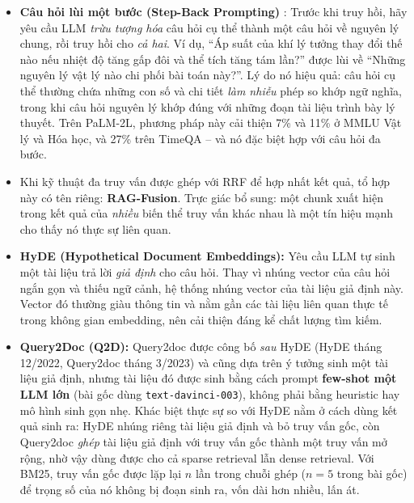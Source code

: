 \begin{itemize}
	\item \textbf{Câu hỏi lùi một bước (Step-Back Prompting)} \cite{zheng2024stepback}: Trước khi truy hồi, hãy yêu cầu LLM \emph{trừu tượng hóa} câu hỏi cụ thể thành một câu hỏi về nguyên lý chung, rồi truy hồi cho \emph{cả hai}. Ví dụ, “Áp suất của khí lý tưởng thay đổi thế nào nếu nhiệt độ tăng gấp đôi và thể tích tăng tám lần?” được lùi về “Những nguyên lý vật lý nào chi phối bài toán này?”. Lý do nó hiệu quả: câu hỏi cụ thể thường chứa những con số và chi tiết \emph{làm nhiễu} phép so khớp ngữ nghĩa, trong khi câu hỏi nguyên lý khớp đúng với những đoạn tài liệu trình bày lý thuyết. Trên PaLM-2L, phương pháp này cải thiện 7\% và 11\% ở MMLU Vật lý và Hóa học, và 27\% trên TimeQA -- và nó đặc biệt hợp với câu hỏi đa bước.
	\item Khi kỹ thuật đa truy vấn được ghép với RRF để hợp nhất kết quả, tổ hợp này có tên riêng: \textbf{RAG-Fusion}. Trực giác bổ sung: một chunk xuất hiện trong kết quả của \emph{nhiều} biến thể truy vấn khác nhau là một tín hiệu mạnh cho thấy nó thực sự liên quan.
	\item \textbf{HyDE (Hypothetical Document Embeddings):} \cite{gao2022hyde}
	Yêu cầu LLM tự sinh một tài liệu trả lời \textit{giả định} cho câu hỏi. Thay vì nhúng vector của câu hỏi ngắn gọn và thiếu ngữ cảnh, hệ thống nhúng vector của tài liệu giả định này. Vector đó thường giàu thông tin và nằm gần các tài liệu liên quan thực tế trong không gian embedding, nên cải thiện đáng kể chất lượng tìm kiếm.
	
	\item \textbf{Query2Doc (Q2D):} \cite{wang2023query2doc} 
	Query2doc được công bố \emph{sau} HyDE (HyDE tháng 12/2022, Query2doc tháng 3/2023) và cũng dựa trên ý tưởng sinh một tài liệu giả định, nhưng tài liệu đó được sinh bằng cách prompt \textbf{few-shot một LLM lớn} (bài gốc dùng \texttt{text-davinci-003}), không phải bằng heuristic hay mô hình sinh gọn nhẹ. Khác biệt thực sự so với HyDE nằm ở cách dùng kết quả sinh ra: HyDE nhúng riêng tài liệu giả định và bỏ truy vấn gốc, còn Query2doc \emph{ghép} tài liệu giả định với truy vấn gốc thành một truy vấn mở rộng, nhờ vậy dùng được cho cả sparse retrieval lẫn dense retrieval. Với BM25, truy vấn gốc được lặp lại $n$ lần trong chuỗi ghép ($n = 5$ trong bài gốc) để trọng số của nó không bị đoạn sinh ra, vốn dài hơn nhiều, lấn át.
	

\end{itemize}
